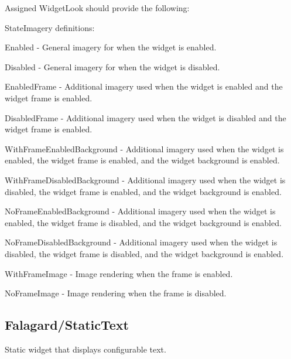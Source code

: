 Assigned Widget\+Look should provide the following\+: 
\begin{DoxyItemize}
\item State\+Imagery definitions\+: 
\begin{DoxyItemize}
\item Enabled -\/ General imagery for when the widget is enabled. 
\item Disabled -\/ General imagery for when the widget is disabled. 
\item Enabled\+Frame -\/ Additional imagery used when the widget is enabled and the widget frame is enabled. 
\item Disabled\+Frame -\/ Additional imagery used when the widget is disabled and the widget frame is enabled. 
\item With\+Frame\+Enabled\+Background -\/ Additional imagery used when the widget is enabled, the widget frame is enabled, and the widget background is enabled. 
\item With\+Frame\+Disabled\+Background -\/ Additional imagery used when the widget is disabled, the widget frame is enabled, and the widget background is enabled. 
\item No\+Frame\+Enabled\+Background -\/ Additional imagery used when the widget is enabled, the widget frame is disabled, and the widget background is enabled. 
\item No\+Frame\+Disabled\+Background -\/ Additional imagery used when the widget is disabled, the widget frame is disabled, and the widget background is enabled. 
\item With\+Frame\+Image -\/ Image rendering when the frame is enabled. 
\item No\+Frame\+Image -\/ Image rendering when the frame is disabled. 
\end{DoxyItemize}
\end{DoxyItemize}\hypertarget{fal_wr_ref_fal_wr_ref_sec_22}{}\subsection{Falagard/\+Static\+Text}\label{fal_wr_ref_fal_wr_ref_sec_22}
Static widget that displays configurable text.

